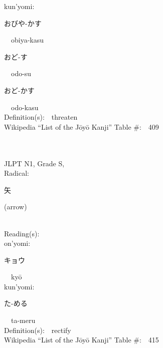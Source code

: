 \begin{multicols}{2}
{\hspace*{1em}}kun'yomi:\ \ \\
{\hspace*{2em}}{\begin{CJK}{UTF8}{min} おびや-かす \end{CJK}}\ \ obiya-kasu\ \ \\
{\hspace*{2em}}{\begin{CJK}{UTF8}{min} おど-す \end{CJK}}\ \ odo-su\ \ \\
{\hspace*{2em}}{\begin{CJK}{UTF8}{min} おど-かす \end{CJK}}\ \ odo-kasu\ \ \\
Definition(s):\ \ threaten \\
Wikipedia ``List of the J\=oy\=o Kanji'' Table \#:\ \ 409 \\
\ \ \\
{\fontsize{34pt}{40pt}  }\ \ \\
{JLPT N1, Grade S, \\Radical:\ \ {\begin{CJK}{UTF8}{min} 矢 \end{CJK}} (arrow) } \\
Reading(s):\ \ \\
{\hspace*{1em}}on'yomi:\ \ \\
{\hspace*{2em}}{\begin{CJK}{UTF8}{min} キョウ \end{CJK}}\ \ ky\=o\ \ \\
{\hspace*{1em}}kun'yomi:\ \ \\
{\hspace*{2em}}{\begin{CJK}{UTF8}{min} た-める \end{CJK}}\ \ ta-meru\ \ \\
Definition(s):\ \ rectify \\
Wikipedia ``List of the J\=oy\=o Kanji'' Table \#:\ \ 415 \\
\ \ \\
{\fontsize{34pt}{40pt}  }\ \ \\

\end{multicols}
